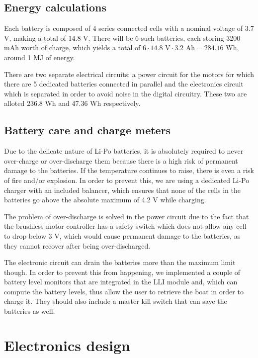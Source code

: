 \subsection{Energy calculations}
	
	Each battery is composed of 4 series connected cells with a nominal voltage of 3.7 V, making a total of 14.8 V. There will be 6 such batteries, each storing 3200 mAh worth of charge, which yields a total of $ 6 \cdot 14.8 \text{ V} \cdot 3.2\text{ Ah} = 284.16 \text{ Wh} $, around 1 MJ of energy.
	
	There are two separate electrical circuits: a power circuit for the motors for which there are 5 dedicated batteries connected in parallel and the electronics circuit which is separated in order to avoid noise in the digital circuitry. These two are alloted 236.8 Wh and 47.36 Wh respectively.
	
	\subsection{Battery care and charge meters}
	
	Due to the delicate nature of Li-Po batteries, it is absolutely required to never over-charge or over-discharge them because there is a high risk of permanent damage to the batteries. If the temperature continues to raise, there is even a risk of fire and/or explosion. In order to prevent this, we are using a dedicated Li-Po charger with an included balancer, which ensures that none of the cells in the batteries go above the absolute maximum of 4.2 V while charging.
	
	The problem of over-discharge is solved in the power circuit due to the fact that the brushless motor controller has a safety switch which does not allow any cell to drop below 3 V, which would cause permanent damage to the batteries, as they cannot recover after being over-discharged. 
	
	The electronic circuit can drain the batteries more than the maximum limit though. In order to prevent this from happening, we implemented a couple of battery level monitors that are integrated in the \ac{LLI} module and, which can compute the battery levels, thus allow the user to retrieve the boat in order to charge it. They should also include a master kill switch that can save the batteries as well.

\section{Electronics design}

